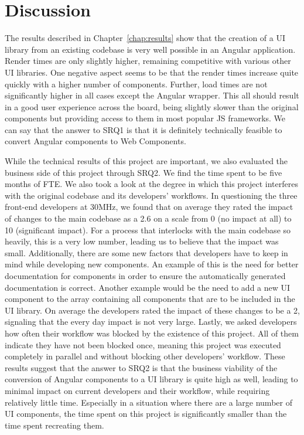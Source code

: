 \chapter{Discussion}\label{chap:discussion}

The results described in Chapter~\ref{chap:results} show that the creation of a UI library from an existing codebase is very well possible in an Angular application. Render times are only slightly higher, remaining competitive with various other UI libraries. One negative aspect seems to be that the render times increase quite quickly with a higher number of components. Further, load times are not significantly higher in all cases except the Angular wrapper. This all should result in a good user experience across the board, being slightly slower than the original components but providing access to them in most popular JS frameworks. We can say that the answer to SRQ1 is that it is definitely technically feasible to convert Angular components to Web Components.

While the technical results of this project are important, we also evaluated the business side of this project through SRQ2. We find the time spent to be five months of FTE\@. We also took a look at the degree in which this project interferes with the original codebase and its developers' workflows. In questioning the three front-end developers at 30MHz, we found that on average they rated the impact of changes to the main codebase as a 2.6 on a scale from 0 (no impact at all) to 10 (significant impact). For a process that interlocks with the main codebase so heavily, this is a very low number, leading us to believe that the impact was small. Additionally, there are some new factors that developers have to keep in mind while developing new components. An example of this is the need for better documentation for components in order to ensure the automatically generated documentation is correct. Another example would be the need to add a new UI component to the array containing all components that are to be included in the UI library. On average the developers rated the impact of these changes to be a 2, signaling that the every day impact is not very large. Lastly, we asked developers how often their workflow was blocked by the existence of this project. All of them indicate they have not been blocked once, meaning this project was executed completely in parallel and without blocking other developers' workflow. These results suggest that the answer to SRQ2 is that the business viability of the conversion of Angular components to a UI library is quite high as well, leading to minimal impact on current developers and their workflow, while requiring relatively little time. Especially in a situation where there are a large number of UI components, the time spent on this project is significantly smaller than the time spent recreating them.

